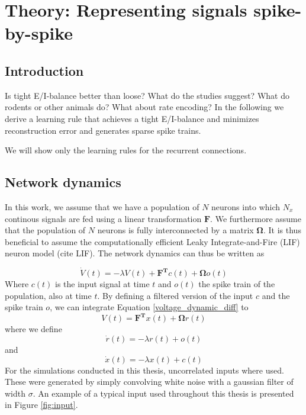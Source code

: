 \documentclass[twoside,11pt]{article}
\begin{document}
\section{Theory: Representing signals spike-by-spike}
\subsection{Introduction}
Is tight E/I-balance better than loose? What do the studies suggest? What do rodents or 
other animals do? What about rate encoding?
In the following we derive a learning rule that achieves a tight E/I-balance and 
minimizes reconstruction error and generates sparse spike trains.

We will show only the learning rules for the recurrent connections.

\subsection{Network dynamics}

In this work, we assume that we have a population of $N$ neurons into which $N_x$ continous
signals are fed using a linear transformation $\mathbf{F}$. We furthermore assume that the population
of $N$ neurons is fully interconnected by a matrix $\mathbf{\Omega}$. It is thus beneficial to assume 
the computationally efficient Leaky Integrate-and-Fire (LIF) neuron model (cite LIF). 
The network dynamics can thus be written as

\begin{equation} \label{voltage_dynamic_diff}
    \dot{V}(t) = -\lambda V(t) + \mathbf{F^T}c(t) + \mathbf{\Omega} o(t) 
\end{equation}
Where $c(t)$ is the input signal at time $t$ and $o(t)$ the spike train of the population, also at
time $t$. By defining a filtered version of the input $c$ and the spike train $o$, we can integrate Equation \ref{voltage_dynamic_diff}
to
\begin{equation} \label{voltage_dynamic_explicit}
    V(t) = \mathbf{F^T}x(t) + \mathbf{\Omega} r(t)
\end{equation}
where we define
\begin{equation} \label{rate_diff}
    \dot{r}(t) = -\lambda r(t) + o(t)
\end{equation}
and 
\begin{equation} \label{input_diff}
    \dot{x}(t) = -\lambda x(t) + c(t)
\end{equation}
For the simulations conducted in this thesis, uncorrelated inputs where used. These were generated
by simply convolving white noise with a gaussian filter of width $\sigma$. An example of a typical
input used throughout this thesis is presented in Figure \ref{fig:input}.
\end{document}
